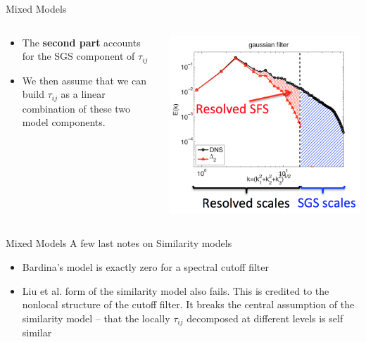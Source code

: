 \begin{frame}{Mixed Models}
\begin{columns}[T]
    \begin{column}{.55\textwidth}
    \begin{minipage}[c][.6\textheight][c]{\linewidth}
    \begin{itemize}
	\item The \textbf{second part} accounts for the SGS component of $\tau_{ij}$
	\item We then assume that we can build $\tau_{ij}$ as a linear combination of these two model components.
\end{itemize}
      \end{minipage}
    \end{column}
    \begin{column}{.55\textwidth}
      \includegraphics[width=\textwidth]{sfs}
    \end{column}
  \end{columns}
\end{frame}

\begin{frame}{Mixed Models}
A few last notes on Similarity models
    \begin{itemize}
	\item Bardina's model is exactly zero for a spectral cutoff filter
	\item Liu et al. form of the similarity model also fails. This is credited to the nonlocal structure of the cutoff filter. It breaks the central assumption of the similarity model -- that the locally $\tau_{ij}$ decomposed at different levels is self similar
\end{itemize}
\end{frame}

